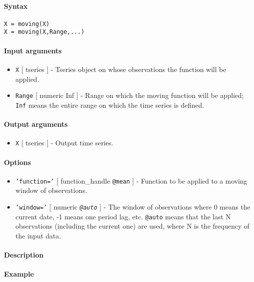 


	\paragraph{Syntax}

\begin{verbatim}
X = moving(X)
X = moving(X,Range,...)
\end{verbatim}

\paragraph{Input arguments}

\begin{itemize}
\item
  \texttt{X} {[} tseries {]} - Tseries object on whose observations the
  function will be applied.
\item
  \texttt{Range} {[} numeric \textbar{} Inf {]} - Range on which the
  moving function will be applied; \texttt{Inf} means the entire range
  on which the time series is defined.
\end{itemize}

\paragraph{Output arguments}

\begin{itemize}
\itemsep1pt\parskip0pt
\item
  \texttt{X} {[} tseries {]} - Output time series.
\end{itemize}

\paragraph{Options}

\begin{itemize}
\item
  \texttt{'function='} {[} function\_handle \textbar{} \texttt{@mean}
  {]} - Function to be applied to a moving window of observations.
\item
  \texttt{'window='} {[} numeric \textbar{} \emph{\texttt{@auto}} {]} -
  The window of observations where 0 means the current date, -1 means
  one period lag, etc. \texttt{@auto} means that the last N observations
  (including the current one) are used, where N is the frequency of the
  input data.
\end{itemize}

\paragraph{Description}

\paragraph{Example}


